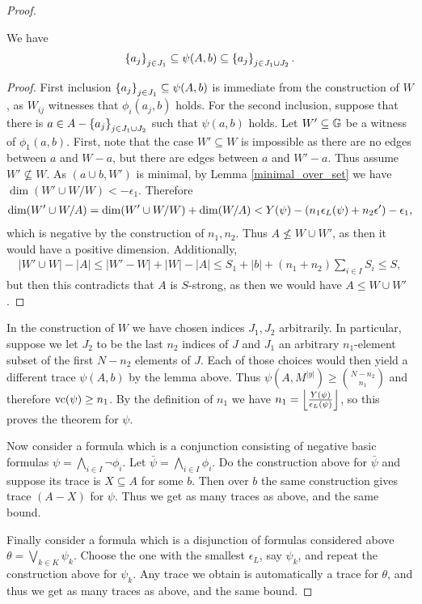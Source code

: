 \begin{proof}
  \begin{Lemma} We have
    \begin{align*}
      \left\{a_j\right\}_{j \in J_1} \subseteq \psi(A, b) \subseteq \left\{a_j\right\}_{j \in J_1 \cup J_2}.
    \end{align*}
  \end{Lemma}
  \begin{proof}
    First inclusion $\left\{a_j\right\}_{j \in J_1} \subseteq \psi(A, b)$ is immediate from the construction of $W$,
    as $W_{ij}$ witnesses that $\phi_i(a_j, b)$ holds.
    For the second inclusion, suppose that there is $a \in A - \left\{a_j\right\}_{j \in J_1 \cup J_2}$ such that $\psi(a,b)$ holds.
    Let $W' \subseteq \mathbb G$ be a witness of $\phi_1(a,b)$.
    First, note that the case $W' \subseteq W$ is impossible
    as there are no edges between $a$ and $W - a$, but there are edges between $a$ and $W' - a$.
    Thus assume $W' \not\subseteq W$.
    As $(a \cup b, W')$ is minimal, by Lemma \ref{minimal_over_set} we have $\dim (W' \cup W / W) < -\epsilon_1$.
    Therefore
    \begin{align*}
      \dim(W' \cup W / A) = \dim (W' \cup W / W) + \dim(W/A) < Y(\psi) - \left(n_1 \epsilon_L(\psi) + n_2 \epsilon'\right) - \epsilon_1,
    \end{align*}
    which is negative by the construction of $n_1, n_2$.
    Thus $A \not\leq W \cup W'$, as then it would have a positive dimension.
    Additionally,
    \begin{align*}
      |W' \cup W| - |A| \leq |W' - W| + |W| - |A| \leq S_1 + |b| + (n_1 + n_2) \sum_{i \in I} S_i \leq S,
    \end{align*}
    but then this contradicts that $A$ is $S$-strong, as then we would have $A \leq W \cup W'$.
  \end{proof}

  In the construction of $W$ we have chosen indices $J_1, J_2$ arbitrarily.
  In particular, suppose we let $J_2$ to be the last $n_2$ indices of $J$ and
  $J_1$ an arbitrary $n_1$-element subset of the first $N - n_2$ elements of $J$.
  Each of those choices would then yield a different trace $\psi(A, b)$ by the lemma above.
  Thus $\psi(A, M^{|y|}) \geq {N - n_2 \choose n_1}$ and therefore $\operatorname{vc}(\psi) \geq n_1$.
  By the definition of $n_1$ we have $n_1 = \left \lfloor \frac{Y(\psi)}{\epsilon_L(\psi)} \right \rfloor$, so this proves the theorem for $\psi$.
 
  Now consider a formula which is a conjunction consisting of negative basic formulas $\psi = \bigwedge_{i \in I} \neg \phi_i$.
  Let $\bar \psi = \bigwedge_{i \in I} \phi_i$.
  Do the construction above for $\bar \psi$ and suppose its trace is $X \subseteq A$ for some $b$.
  Then over $b$ the same construction gives trace $(A - X)$ for $\psi$. Thus we get as many traces as above, and the same bound.
  
  Finally consider a formula which is a disjunction of formulas considered above $\theta = \bigvee_{k \in K} \psi_k$.
  Choose the one with the smallest $\epsilon_L$, say $\psi_k$, and repeat the construction above for $\psi_k$.
  Any trace we obtain is automatically a trace for $\theta$, and thus we get as many traces as above, and the same bound.
\end{proof}

